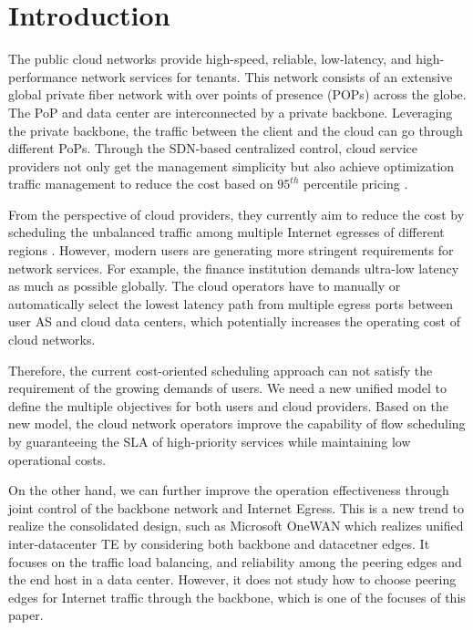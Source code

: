 \section{Introduction}
The public cloud networks provide high-speed, reliable, low-latency, and high-performance network services for tenants. This network consists of an extensive global private fiber network with over points of presence (POPs) across the globe. The PoP and data center are interconnected by a private backbone. Leveraging the private backbone, the traffic between the client and the cloud can go through different PoPs. Through the SDN-based centralized control, cloud service providers not only get the management simplicity but also achieve optimization traffic management to reduce the cost based on $95^{th}$ percentile pricing \cite{hong2013achieving,singh2021costCascara}. 

From the perspective of cloud providers, they currently aim to reduce the cost by scheduling the unbalanced traffic among multiple Internet egresses of different regions \cite{yap2017espresso,schlinker2017edgefabric,casado2012fabric}. 
However, modern users are generating more stringent requirements for network services. For example, the finance institution demands ultra-low latency as much as possible globally. The cloud operators have to manually or automatically select the lowest latency path from multiple egress ports between user AS and cloud data centers, which potentially increases the operating cost of cloud networks. 

Therefore, the current cost-oriented scheduling approach can not satisfy the requirement of the growing demands of users. We need a new unified model to define the multiple objectives for both users and cloud providers. Based on the new model, the cloud network operators improve the capability of flow scheduling by guaranteeing the SLA of high-priority services while maintaining low operational costs.

On the other hand, we can further improve the operation effectiveness through joint control of the backbone network and Internet Egress. This is a new trend to realize the consolidated design, such as Microsoft OneWAN \cite{krishnaswamy2023onewan} which realizes unified inter-datacenter TE by considering both backbone and datacetner edges. It focuses on the traffic load balancing, and reliability among the peering edges and the end host in a data center. However, it does not study how to choose peering edges for Internet traffic through the backbone, which is one of the focuses of this paper.

